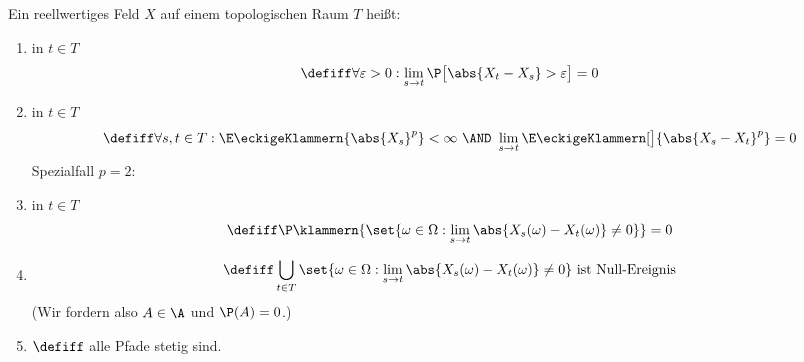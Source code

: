 \begin{definition}\label{def2.2.2}
	Ein reellwertiges Feld $X$ auf einem topologischen Raum $T$ heißt:
	\begin{enumerate}[label=(\roman*)]
		\item {} in $t\in T$
		\begin{align*}
			\defiff\forall\varepsilon>0:\lim\limits_{s\to t}\P\big[\abs{X_t-X_s}>\varepsilon\big]=0
		\end{align*}
		\item {} in $t\in T$
		\begin{align*}
			\defiff\forall s,t\in T:\E\eckigeKlammern{\abs{X_s}^p}<\infty
			~\AND~
			\lim\limits_{s\to t}\E\eckigeKlammern[\big]{\abs{X_s-X_t}^p}=0
		\end{align*}
		Spezialfall $p=2$: 
		\item {} in $t\in T$
		\begin{align*}
			\defiff\P\klammern{\set{\omega\in\Omega:\lim\limits_{s\to t}\abs{X_s(\omega)-X_t(\omega)}\neq0}}=0
		\end{align*}
		\item {}
		\begin{align*}
			\defiff\bigcup\limits_{t\in T}\set{\omega\in\Omega:\lim\limits_{s\to t}\abs{X_s(\omega)-X_t(\omega)}\neq 0}\text{ ist Null-Ereignis}
		\end{align*}
		(Wir fordern also $A\in\A$ und $\P(A)=0$.)
		\item {} $\defiff$ alle Pfade stetig sind.
	\end{enumerate}
\end{definition}

